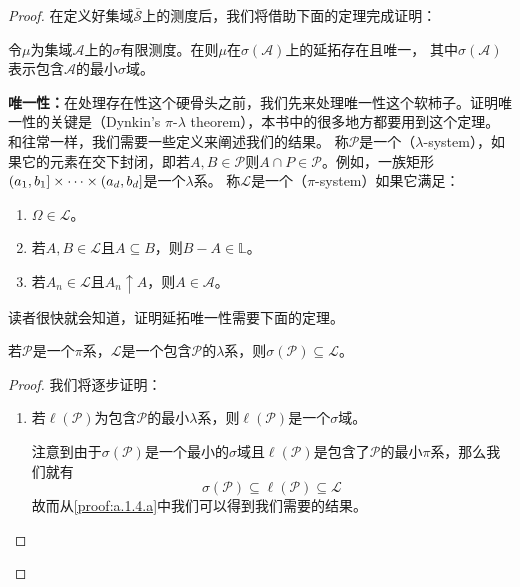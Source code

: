 \documentclass[main.tex]{subfiles}
\begin{document}
\begin{proof}
	在定义好集域\(\bar{\mathcal{S}}\)上的测度后，我们将借助下面的定理完成证明：
	\begin{theorem}\label{thm:a.1.3}
		令\(\mu\)为集域\(\mathcal{A}\)上的\(\sigma\)有限测度。在则\(\mu\)在\(\sigma(\mathcal{A})\)上的延拓存在且唯一， 其中\(\sigma(\mathcal{A})\)表示包含\(\mathcal{A}\)的最小\(\sigma\)域。
	\end{theorem}
	\textbf{唯一性：}在处理存在性这个硬骨头之前，我们先来处理唯一性这个软柿子。证明唯一性的关键是（Dynkin's  \(\pi\)-\(\lambda\) theorem），本书中的很多地方都要用到这个定理。
	和往常一样，我们需要一些定义来阐述我们的结果。
	称\(\mathcal{P}\)是一个（\(\lambda\)-system），如果它的元素在交下封闭，即若\(A,B \in \mathcal{P}\)则\(A\cap P \in \mathcal{P}\)。例如，一族矩形\(\intoc{a_1, b_1}\times\cdots\times\intoc{a_d, b_d}\)是一个\(\lambda\)系。
	称\(\mathcal{L}\)是一个（\(\pi\)-system）如果它满足：\begin{enumerate}
		\item \(\Omega \in \mathcal{L}\)。
		\item 若\(A, B \in \mathcal{L}\)且\(A \subseteq B\)，则\(B-A \in \mathbb{L}\)。
		\item 若\(A_n \in \mathcal{L}\)且\(A_n \uparrow A\)，则\(A \in \mathcal{A}\)。
	\end{enumerate}
	读者很快就会知道，证明延拓唯一性需要下面的定理。

	\begin{theorem}\label{thm:a.1.4}
		若\(\mathcal{P}\)是一个\(\pi\)系，\(\mathcal{L}\)是一个包含\(\mathcal{P}\)的\(\lambda\)系，则\(\sigma(\mathcal{P}) \subseteq \mathcal{L}\)。
	\end{theorem}
	\begin{proof}
		我们将逐步证明：
		\begin{enumerate}[label=(\alph*)]
			\item\label{proof:a.1.4.a} 若\(\ell(\mathcal{P})\)为包含\(\mathcal{P}\)的最小\(\lambda\)系，则\(\ell(\mathcal{P})\)是一个\(\sigma\)域。

			注意到由于\(\sigma(\mathcal{P})\)是一个最小的\(\sigma\)域且\(\ell(\mathcal{P})\)是包含了\(\mathcal{P}\)的最小\(\pi\)系，那么我们就有
			\[\sigma(\mathcal{P}) \subseteq \ell(\mathcal{P}) \subseteq \mathcal{L}\]
			故而从\ref{proof:a.1.4.a}中我们可以得到我们需要的结果。


\end{enumerate}
\end{proof}
\end{proof}
\end{document}
